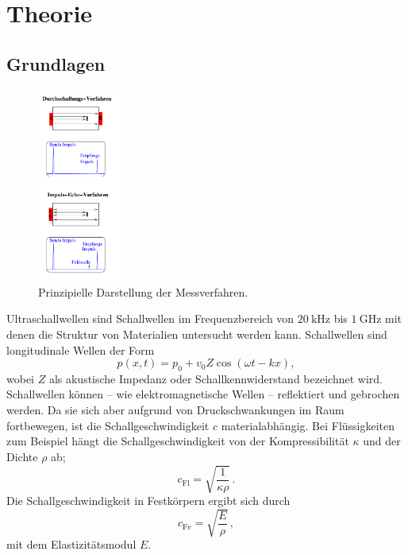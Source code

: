 \section{Theorie}
\label{sec:Theorie}
\subsection{Grundlagen}
\begin{figure}
	\centering
	\includegraphics[width=0.25\textwidth]{Bilder/Messverfahren.png}
	\caption{Prinzipielle Darstellung der Messverfahren. \cite{Anleitung}}
	\label{fig:echo}
\end{figure}
Ultraschallwellen sind Schallwellen im Frequenzbereich von $\SI{20}{\kilo\hertz}$ bis
$\SI{1}{\giga\hertz}$ mit denen die Struktur von Materialien untersucht werden kann.
Schallwellen sind longitudinale Wellen der Form
\begin{equation}
	p(x,t) = p_0 + v_0 Z \cos(\omega t - kx) \mathrm{,}
\end{equation}
wobei $Z$ als akustische Impedanz oder Schallkennwiderstand bezeichnet wird.
Schallwellen können -- wie elektromagnetische Wellen -- reflektiert und gebrochen werden.
Da sie sich aber aufgrund von Druckschwankungen im Raum fortbewegen, ist die
Schallgeschwindigkeit $c$ materialabhängig. Bei Flüssigkeiten zum Beispiel hängt die
Schallgeschwindigkeit von der Kompressibilität $\kappa$ und der Dichte $\rho$ ab;
\begin{equation}
	c_{\mathrm{Fl}} = \sqrt{\frac{1}{\kappa\rho}} \, \mathrm{.}
\end{equation}
Die Schallgeschwindigkeit in Festkörpern ergibt sich durch
\begin{equation}
	c_{\mathrm{Fe}} = \sqrt{\frac{E}{\rho}} \, \mathrm{,}
\end{equation}
mit dem Elastizitätsmodul $E$.
